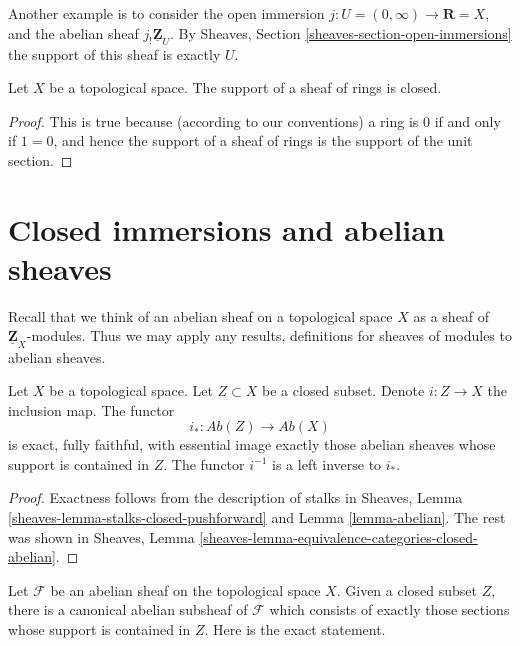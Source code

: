 \medskip\noindent
Another example is to consider the open immersion
$j : U = (0 , \infty) \to \mathbf{R} = X$, and the abelian sheaf
$j_!\underline{\mathbf{Z}}_U$. By Sheaves, Section
\ref{sheaves-section-open-immersions} the support of
this sheaf is exactly $U$.

\begin{lemma}
\label{lemma-support-sheaf-rings-closed}
Let $X$ be a topological space.
The support of a sheaf of rings is closed.
\end{lemma}

\begin{proof}
This is true because (according to our conventions)
a ring is $0$ if and only if
$1 = 0$, and hence the support of a sheaf of rings
is the support of the unit section.
\end{proof}






\section{Closed immersions and abelian sheaves}
\label{section-closed-immersions}

\noindent
Recall that we think of an abelian sheaf on a topological space $X$ as a
sheaf of $\underline{\mathbf{Z}}_X$-modules. Thus we may apply any results,
definitions for sheaves of modules to abelian sheaves.

\begin{lemma}
\label{lemma-i-star-exact}
Let $X$ be a topological space. Let $Z \subset X$ be a closed subset.
Denote $i : Z \to X$ the inclusion map. The functor
$$
i_* : \textit{Ab}(Z) \longrightarrow \textit{Ab}(X)
$$
is exact, fully faithful, with essential image exactly those
abelian sheaves whose support is contained in $Z$. The functor $i^{-1}$
is a left inverse to $i_*$.
\end{lemma}

\begin{proof}
Exactness follows from the description of
stalks in Sheaves, Lemma \ref{sheaves-lemma-stalks-closed-pushforward}
and Lemma \ref{lemma-abelian}. The rest was shown in
Sheaves, Lemma \ref{sheaves-lemma-equivalence-categories-closed-abelian}.
\end{proof}

\noindent
Let $\mathcal{F}$ be an abelian sheaf on the topological space $X$. Given
a closed subset $Z$, there is a canonical abelian subsheaf of $\mathcal{F}$
which consists of exactly those sections whose support is contained in $Z$.
Here is the exact statement.

